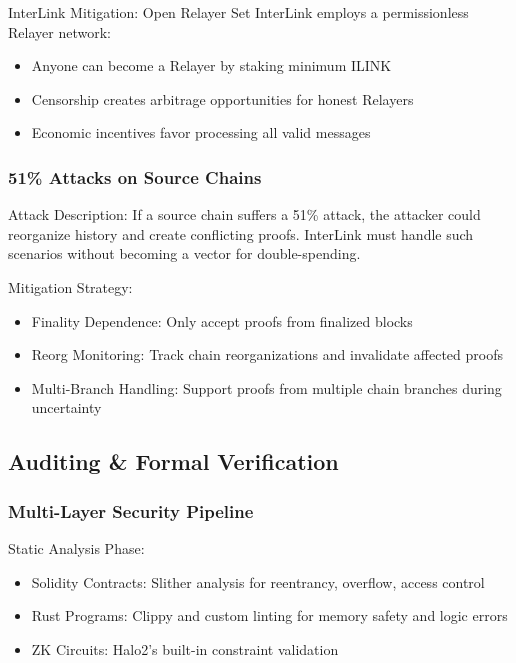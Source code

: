 \documentclass[11pt,a4paper]{article}
\begin{document}
InterLink Mitigation: Open Relayer Set
InterLink employs a permissionless Relayer network:
\begin{itemize}
    \item Anyone can become a Relayer by staking minimum ILINK
    \item Censorship creates arbitrage opportunities for honest Relayers
    \item Economic incentives favor processing all valid messages
\end{itemize}

\subsubsection{51\% Attacks on Source Chains}

Attack Description:
If a source chain suffers a 51\% attack, the attacker could reorganize history and create conflicting proofs. InterLink must handle such scenarios without becoming a vector for double-spending.

Mitigation Strategy:
\begin{itemize}
    \item Finality Dependence: Only accept proofs from finalized blocks
    \item Reorg Monitoring: Track chain reorganizations and invalidate affected proofs
    \item Multi-Branch Handling: Support proofs from multiple chain branches during uncertainty
\end{itemize}

\subsection{Auditing \& Formal Verification}

\subsubsection{Multi-Layer Security Pipeline}

Static Analysis Phase:
\begin{itemize}
    \item Solidity Contracts: Slither analysis for reentrancy, overflow, access control
    \item Rust Programs: Clippy and custom linting for memory safety and logic errors
    \item ZK Circuits: Halo2's built-in constraint validation
\end{itemize}
\end{document}
